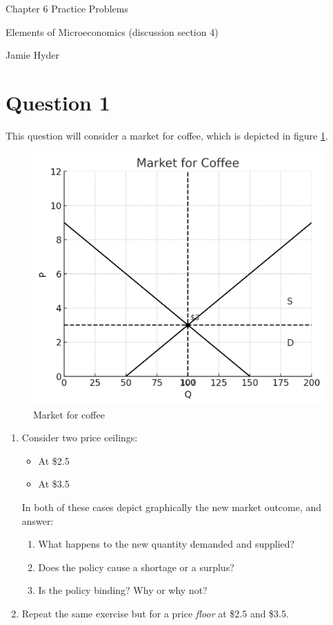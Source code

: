 \documentclass[12pt]{article}
\begin{document}
\begin{center}
\Large Chapter 6 Practice Problems

\medskip

\normalsize Elements of Microeconomics (discussion section 4)

\medskip

\small Jamie Hyder
\end{center}

\section*{Question 1}
This question will consider a market for coffee, which is depicted in figure \ref{fig:coffee_eq}.

\begin{figure}[h]
    \centering
    \includegraphics[width=.6\textwidth]{output-2.png}
    \caption{Market for coffee}
    \label{fig:coffee_eq}
\end{figure}

\begin{enumerate}

\item Consider two price ceilings:
    \begin{itemize}
        \item At \$2.5
        \item At \$3.5
    \end{itemize}

    \vspace{5mm}

    In both of these cases depict graphically the new market outcome, and answer:
    \begin{enumerate}
        \item What happens to the new quantity demanded and supplied?
        \item Does the policy cause a shortage or a surplus?
        \item Is the policy binding? Why or why not?
    \end{enumerate}

    


\item Repeat the same exercise but for a price \textit{floor} at \$2.5 and \$3.5.
\end{enumerate}
\end{document}
